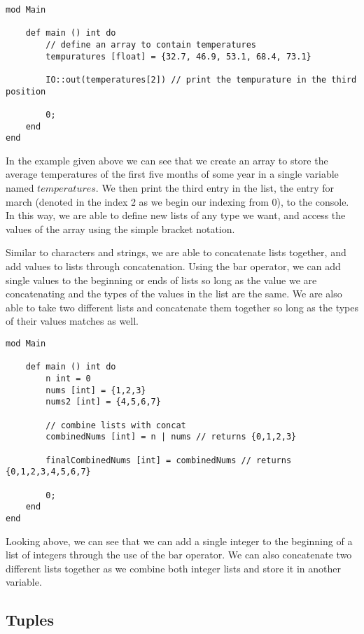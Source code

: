\documentclass{article}
\begin{document}
\begin{lstlisting}
mod Main

	def main () int do
		// define an array to contain temperatures
		tempuratures [float] = {32.7, 46.9, 53.1, 68.4, 73.1}

		IO::out(temperatures[2]) // print the tempurature in the third position

		0;
	end
end
\end{lstlisting}

In the example given above we can see that we create an array to store the average temperatures of the first five months of some year in a single variable named $temperatures$.
We then print the third entry in the list, the entry for march (denoted in the index 2 as we begin our indexing from 0), to the console. In this way, we are able to define
new lists of any type we want, and access the values of the array using the simple bracket notation.

Similar to characters and strings, we are able to concatenate lists together, and add values to lists through concatenation. Using the bar operator, we can add single
values to the beginning or ends of lists so long as the value we are concatenating and the types of the values in the list are the same. We are also able to take two
different lists and concatenate them together so long as the types of their values matches as well.

\begin{lstlisting}
mod Main

	def main () int do
		n int = 0
		nums [int] = {1,2,3}
		nums2 [int] = {4,5,6,7}

		// combine lists with concat
		combinedNums [int] = n | nums // returns {0,1,2,3}

		finalCombinedNums [int] = combinedNums // returns {0,1,2,3,4,5,6,7}

		0;
	end
end
\end{lstlisting}

Looking above, we can see that we can add a single integer to the beginning of a list of integers through the use of the bar operator. We can also concatenate two
different lists together as we combine both integer lists and store it in another variable.


\subsection{Tuples}
\end{document}
